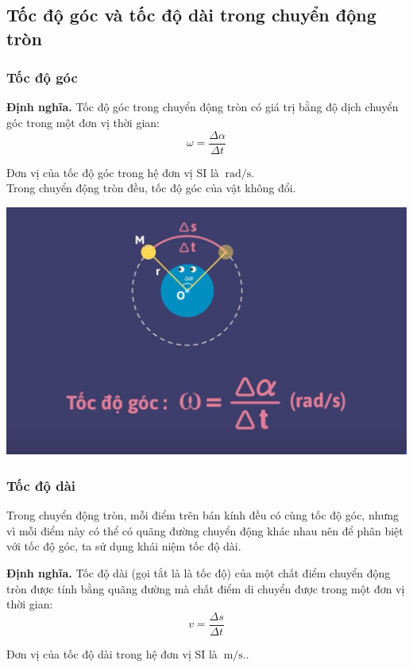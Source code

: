 \subsection{Tốc độ góc và tốc độ dài trong chuyển động tròn}
\subsubsection{Tốc độ góc}
\textbf{Định nghĩa.} Tốc độ góc trong chuyển động tròn có giá trị bằng độ dịch chuyển góc trong một đơn vị thời gian:
$$\omega = \frac{\Delta \alpha}{\Delta t}$$

Đơn vị của tốc độ góc trong hệ đơn vị SI là $\SI{}{\radian/\second}$.\\

Trong chuyển động tròn đều, tốc độ góc của vật không đổi. 
\begin{center}
	\includegraphics[scale=0.3]{../figs/VN10-PH-06-L-005-2-V2-02.jpg}
\end{center}
\subsubsection{Tốc độ dài}
Trong chuyển động tròn, mỗi điểm trên bán kính đều có cùng tốc độ góc, nhưng vì mỗi điểm này có thể có quãng đường chuyển động khác nhau nên để phân biệt với tốc độ góc, ta sử dụng khái niệm tốc độ dài.

\textbf{Định nghĩa.} Tốc độ dài (gọi tắt là là tốc độ) của một chất điểm chuyển động tròn được tính bằng quãng đường mà chất điểm di chuyển được trong một đơn vị thời gian:
$$v=\frac{\Delta s}{\Delta t} $$

Đơn vị của tốc độ dài trong hệ đơn vị SI là $\SI{}{\meter/\second.}$.\\

